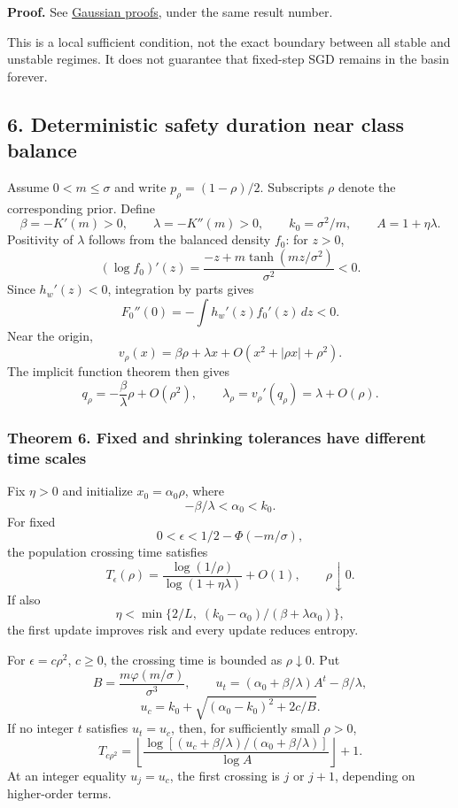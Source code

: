 \textbf{Proof.} See \href{gaussian_proofs.md}{Gaussian proofs}, under
the same result number.

This is a local sufficient condition, not the exact boundary between all
stable and unstable regimes. It does not guarantee that fixed-step SGD
remains in the basin forever.

\subsection{6. Deterministic safety duration near class
balance}\label{draft-deterministic-safety-duration-near-class-balance}

Assume \(0<m\le\sigma\) and write \(p_\rho=(1-\rho)/2\). Subscripts
\(\rho\) denote the corresponding prior. Define \[
\beta=-K'(m)>0,\qquad \lambda=-K''(m)>0,\qquad
k_0=\sigma^2/m,\qquad A=1+\eta\lambda.
\] Positivity of \(\lambda\) follows from the balanced density \(f_0\):
for \(z>0\), \[
(\log f_0)'(z)=\frac{-z+m\tanh(mz/\sigma^2)}{\sigma^2}<0.
\] Since \(h_w'(z)<0\), integration by parts gives \[
F_0''(0)=-\int h_w'(z)f_0'(z)\,dz<0.
\] Near the origin, \[
v_\rho(x)=\beta\rho+\lambda x+O(x^2+|\rho x|+\rho^2).
\] The implicit function theorem then gives \[
q_\rho=-\frac\beta\lambda\rho+O(\rho^2),\qquad
\lambda_\rho=v_\rho'(q_\rho)=\lambda+O(\rho).
\]

\subsubsection{Theorem 6. Fixed and shrinking tolerances have different
time
scales}\label{draft-theorem-6.-fixed-and-shrinking-tolerances-have-different-time-scales}

Fix \(\eta>0\) and initialize \(x_0=\alpha_0\rho\), where \[
-\beta/\lambda<\alpha_0<k_0.
\] For fixed \[
0<\epsilon<1/2-\Phi(-m/\sigma),
\] the population crossing time satisfies \[
T_\epsilon(\rho)=\frac{\log(1/\rho)}{\log(1+\eta\lambda)}+O(1),
\qquad \rho\downarrow0.
\] If also \[
\eta<\min\{2/L,\;(k_0-\alpha_0)/(\beta+\lambda\alpha_0)\},
\] the first update improves risk and every update reduces entropy.

For \(\epsilon=c\rho^2\), \(c\ge0\), the crossing time is bounded as
\(\rho\downarrow0\). Put \[
B=\frac{m\varphi(m/\sigma)}{\sigma^3},\qquad
u_t=(\alpha_0+\beta/\lambda)A^t-\beta/\lambda,
\] \[
u_c=k_0+\sqrt{(\alpha_0-k_0)^2+2c/B}.
\] If no integer \(t\) satisfies \(u_t=u_c\), then, for sufficiently
small \(\rho>0\), \[
T_{c\rho^2}=
\left\lfloor
\frac{\log[(u_c+\beta/\lambda)/(\alpha_0+\beta/\lambda)]}
{\log A}\right\rfloor+1.
\] At an integer equality \(u_j=u_c\), the first crossing is \(j\) or
\(j+1\), depending on higher-order terms.


